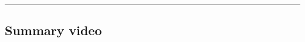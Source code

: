 \documentclass[
]{book}
\begin{document}
\begin{center}\rule{0.5\linewidth}{0.5pt}\end{center}

\hypertarget{summary-video}{%
\subsection*{Summary video}\label{summary-video}}

  
\end{document}
